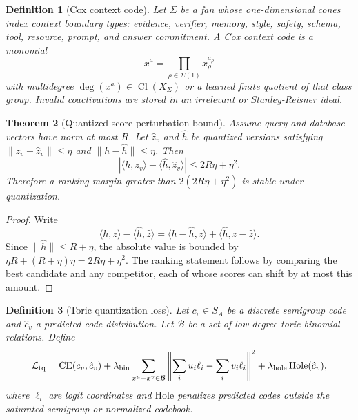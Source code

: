 \documentclass[11pt]{article}
\newtheorem{theorem}{Theorem}[section]
\newtheorem{definition}[theorem]{Definition}
\newcommand{\loss}{\mathcal{L}}
\newcommand{\onecones}{one-dimensional cones}
\numberwithin{equation}{section}
\begin{document}
\begin{definition}[Cox context code]
Let $\Sigma$ be a fan whose \onecones{} index context boundary types: evidence, verifier, memory, style, safety, schema, tool, resource, prompt, and answer commitment. A Cox context code is a monomial
\begin{equation}
 x^a=\prod_{\rho\in\Sigma(1)}x_\rho^{a_\rho}
\end{equation}
with multidegree $\deg(x^a)\in \operatorname{Cl}(X_\Sigma)$ or a learned finite quotient of that class group. Invalid coactivations are stored in an irrelevant or Stanley-Reisner ideal.
\end{definition}

\begin{theorem}[Quantized score perturbation bound]
Assume query and database vectors have norm at most $R$. Let $\hat z_v$ and $\hat h$ be quantized versions satisfying $\|z_v-\hat z_v\|\le\eta$ and $\|h-\hat h\|\le\eta$. Then
\begin{equation}
|\langle h,z_v\rangle-\langle \hat h,\hat z_v\rangle|\le 2R\eta+\eta^2.
\end{equation}
Therefore a ranking margin greater than $2(2R\eta+\eta^2)$ is stable under quantization.
\end{theorem}
\begin{proof}
Write
\begin{equation}
\langle h,z\rangle-\langle \hat h,\hat z\rangle=\langle h-\hat h,z\rangle+\langle \hat h,z-\hat z\rangle.
\end{equation}
Since $\|\hat h\|\le R+\eta$, the absolute value is bounded by $\eta R+(R+\eta)\eta=2R\eta+\eta^2$. The ranking statement follows by comparing the best candidate and any competitor, each of whose scores can shift by at most this amount.
\end{proof}

\begin{definition}[Toric quantization loss]
Let $c_v\in S_A$ be a discrete semigroup code and $\hat c_v$ a predicted code distribution. Let $\mathcal{B}$ be a set of low-degree toric binomial relations. Define
\begin{equation}
\loss_{\rm tq}=\mathrm{CE}(c_v,\hat c_v)+\lambda_{\rm bin}\sum_{x^u-x^v\in\mathcal{B}}\left\|\sum_i u_i\ell_i-\sum_i v_i\ell_i\right\|^2+\lambda_{\rm hole}\,\mathrm{Hole}(\hat c_v),
\end{equation}
where $\ell_i$ are logit coordinates and $\mathrm{Hole}$ penalizes predicted codes outside the saturated semigroup or normalized codebook.
\end{definition}
\end{document}
